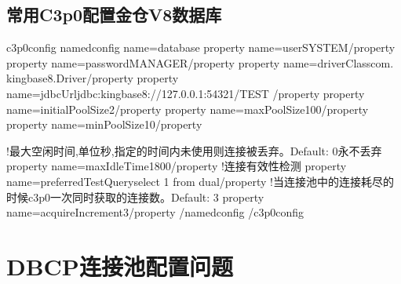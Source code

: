 \documentclass[letterpaper,10pt,english]{sphinxmanual}
\begin{document}
\subsection{常用C3p0配置金仓V8数据库}
\label{\detokenize{interface/c3p0:c3p0v8}}
\begin{sphinxVerbatim}[commandchars=\\\{\}]
\PYGZlt{}c3p0\PYGZhy{}config\PYGZgt{}
       \PYGZlt{}named\PYGZhy{}config name=\PYGZdq{}database\PYGZdq{}\PYGZgt{}
    \PYGZlt{}property name=\PYGZdq{}user\PYGZdq{}\PYGZgt{}SYSTEM\PYGZlt{}/property\PYGZgt{}
    \PYGZlt{}property name=\PYGZdq{}password\PYGZdq{}\PYGZgt{}MANAGER\PYGZlt{}/property\PYGZgt{}
    \PYGZlt{}property name=\PYGZdq{}driverClass\PYGZdq{}\PYGZgt{}com. kingbase8.Driver\PYGZlt{}/property\PYGZgt{}
    \PYGZlt{}property name=\PYGZdq{}jdbcUrl\PYGZdq{}\PYGZgt{}jdbc:kingbase8://127.0.0.1:54321/TEST \PYGZlt{}/property\PYGZgt{}
\PYGZlt{}property name=\PYGZdq{}initialPoolSize\PYGZdq{}\PYGZgt{}2\PYGZlt{}/property\PYGZgt{}
    \PYGZlt{}property name=\PYGZdq{}maxPoolSize\PYGZdq{}\PYGZgt{}100\PYGZlt{}/property\PYGZgt{}
\PYGZlt{}property name=\PYGZdq{}minPoolSize\PYGZdq{}\PYGZgt{}10\PYGZlt{}/property\PYGZgt{}

\PYGZlt{}!\PYGZhy{}\PYGZhy{}最大空闲时间,单位秒,指定的时间内未使用则连接被丢弃。Default: 0永不丢弃\PYGZhy{}\PYGZhy{}\PYGZgt{}
\PYGZlt{}property name=\PYGZdq{}maxIdleTime\PYGZdq{}\PYGZgt{}1800\PYGZlt{}/property\PYGZgt{}
\PYGZlt{}!\PYGZhy{}\PYGZhy{}连接有效性检测\PYGZhy{}\PYGZhy{}\PYGZgt{}
        \PYGZlt{}property name=\PYGZdq{}preferredTestQuery\PYGZdq{}\PYGZgt{}select 1 from dual\PYGZlt{}/property\PYGZgt{}
        \PYGZlt{}!\PYGZhy{}\PYGZhy{}当连接池中的连接耗尽的时候c3p0一次同时获取的连接数。Default: 3 \PYGZhy{}\PYGZhy{}\PYGZgt{}
        \PYGZlt{}property name=\PYGZdq{}acquireIncrement\PYGZdq{}\PYGZgt{}3\PYGZlt{}/property\PYGZgt{}
       \PYGZlt{}/named\PYGZhy{}config\PYGZgt{}
\PYGZlt{}/c3p0\PYGZhy{}config\PYGZgt{}
\end{sphinxVerbatim}


\section{DBCP连接池配置问题}
\label{\detokenize{interface/DBCP:dbcp}}\label{\detokenize{interface/DBCP::doc}}
\end{document}

